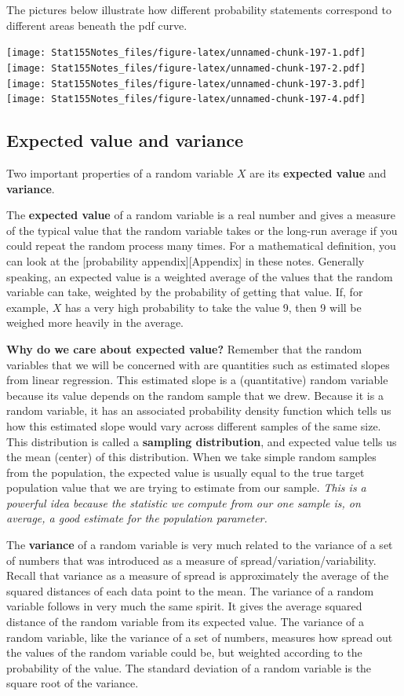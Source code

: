 \documentclass[]{book}
\begin{document}
The pictures below illustrate how different probability statements correspond to different areas beneath the pdf curve.

\texttt{[image: Stat155Notes\_files/figure-latex/unnamed-chunk-197-1.pdf]} \texttt{[image: Stat155Notes\_files/figure-latex/unnamed-chunk-197-2.pdf]} \texttt{[image: Stat155Notes\_files/figure-latex/unnamed-chunk-197-3.pdf]} \texttt{[image: Stat155Notes\_files/figure-latex/unnamed-chunk-197-4.pdf]}

\hypertarget{expected-value-and-variance}{%
\subsection{Expected value and variance}\label{expected-value-and-variance}}

Two important properties of a random variable \(X\) are its \textbf{expected value} and \textbf{variance}.

The \textbf{expected value} of a random variable is a real number and gives a measure of the typical value that the random variable takes or the long-run average if you could repeat the random process many times. For a mathematical definition, you can look at the {[}probability appendix{]}{[}Appendix{]} in these notes. Generally speaking, an expected value is a weighted average of the values that the random variable can take, weighted by the probability of getting that value. If, for example, \(X\) has a very high probability to take the value 9, then 9 will be weighed more heavily in the average.

\textbf{Why do we care about expected value?} Remember that the random variables that we will be concerned with are quantities such as estimated slopes from linear regression. This estimated slope is a (quantitative) random variable because its value depends on the random sample that we drew. Because it is a random variable, it has an associated probability density function which tells us how this estimated slope would vary across different samples of the same size. This distribution is called a \textbf{sampling distribution}, and expected value tells us the mean (center) of this distribution. When we take simple random samples from the population, the expected value is usually equal to the true target population value that we are trying to estimate from our sample. \emph{This is a powerful idea because the statistic we compute from our one sample is, on average, a good estimate for the population parameter.}

The \textbf{variance} of a random variable is very much related to the variance of a set of numbers that was introduced as a measure of spread/variation/variability. Recall that variance as a measure of spread is approximately the average of the squared distances of each data point to the mean. The variance of a random variable follows in very much the same spirit. It gives the average squared distance of the random variable from its expected value. The variance of a random variable, like the variance of a set of numbers, measures how spread out the values of the random variable could be, but weighted according to the probability of the value. The standard deviation of a random variable is the square root of the variance.
\end{document}
